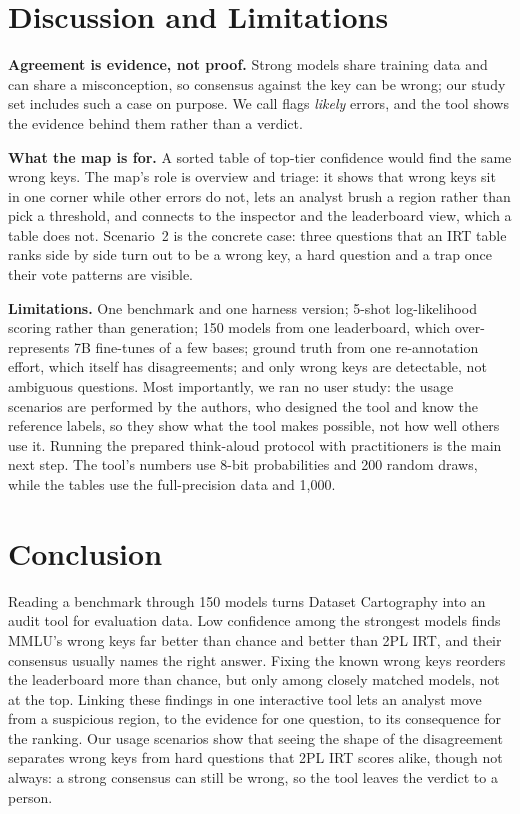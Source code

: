 \documentclass[10pt]{article}
\begin{document}
\section{Discussion and Limitations}

\textbf{Agreement is evidence, not proof.} Strong models share training data and can share a
misconception, so consensus against the key can be wrong; our study set includes such a case on
purpose. We call flags \emph{likely} errors, and the tool shows the evidence behind them rather than
a verdict.

\textbf{What the map is for.} A sorted table of top-tier confidence would find the same wrong keys.
The map's role is overview and triage: it shows that wrong keys sit in one corner while other errors
do not, lets an analyst brush a region rather than pick a threshold, and connects to the inspector and
the leaderboard view, which a table does not. Scenario~2 is the concrete case: three questions that
an IRT table ranks side by side turn out to be a wrong key, a hard question and a trap once their
vote patterns are visible.

\textbf{Limitations.} One benchmark and one harness version; 5-shot log-likelihood scoring rather than
generation; 150 models from one leaderboard, which over-represents 7B fine-tunes of a few bases; ground
truth from one re-annotation effort, which itself has disagreements; and only wrong keys are detectable,
not ambiguous questions. Most importantly, we ran no user study: the usage scenarios are performed
by the authors, who designed the tool and know the reference labels, so they show what the tool
makes possible, not how well others use it. Running the prepared think-aloud protocol with
practitioners is the main next step. The tool's numbers use 8-bit probabilities and 200 random draws, while the tables use
the full-precision data and 1,000.

\section{Conclusion}

Reading a benchmark through 150 models turns Dataset Cartography into an audit tool for evaluation
data. Low confidence among the strongest models finds MMLU's wrong keys far better than chance and
better than 2PL IRT, and their consensus usually names the right answer. Fixing the known wrong keys
reorders the leaderboard more than chance, but only among closely matched models, not at the top.
Linking these findings in one interactive tool lets an analyst move from a suspicious region, to the
evidence for one question, to its consequence for the ranking. Our usage scenarios show that seeing the shape of the
disagreement separates wrong keys from hard questions that 2PL IRT scores alike, though not always:
a strong consensus can still be wrong, so the tool leaves the verdict to a person.
\end{document}
